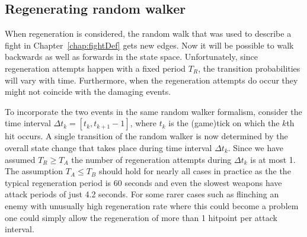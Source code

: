 \subsection{Regenerating random walker}\label{chap:regen-walker}
When regeneration is considered, the random walk that was used to describe a fight in Chapter~\ref{chap:fightDef} gets new edges. Now it will be possible to walk backwards as well as forwards in the state space. Unfortunately, since regeneration attempts happen with a fixed period $T_R$, the transition probabilities will vary with time. Furthermore, when the regeneration attempts do occur they might not coincide with the damaging events.

To incorporate the two events in the same random walker formalism, consider the time interval $\Delta t_k = [t_k, t_{k+1}-1]$, where $t_k$ is the (game)tick on which the $k$th hit occurs. A single transition of the random walker is now determined by the overall state change that takes place during time interval $\Delta t_k$. Since we have assumed $T_R \geq T_A$ the number of regeneration attempts during $\Delta t_k$ is at most 1.
The assumption $T_A \leq T_B$ should hold for nearly all cases in practice as the the typical regeneration period is 60 seconds and even the slowest weapons have attack periods of just 4.2 seconds. For some rarer cases such as flinching an enemy with unusually high regeneration rate where this could become a problem one could simply allow the regeneration of more than 1 hitpoint per attack interval.

